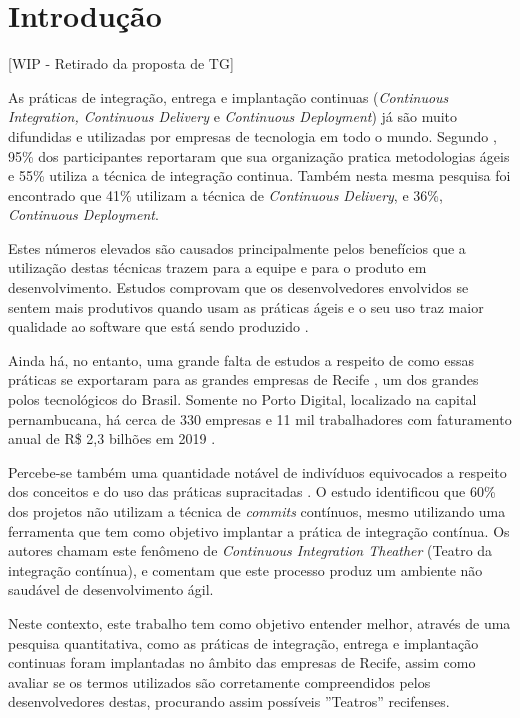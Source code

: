 
\chapter{Introdução}

[WIP - Retirado da proposta de TG]

As práticas de integração, entrega e implantação continuas (\emph{Continuous Integration, Continuous Delivery} e \emph{Continuous Deployment}) já são muito difundidas e utilizadas por empresas de tecnologia em todo o mundo. Segundo \cite{stateAgileReport2020}, 95\% dos participantes reportaram que sua organização pratica metodologias ágeis e 55\% utiliza a técnica de integração continua. Também nesta mesma pesquisa foi encontrado que 41\% utilizam a técnica de \emph{Continuous Delivery}, e 36\%, \emph{Continuous Deployment}.

Estes números elevados são causados principalmente pelos benefícios que a utilização destas técnicas trazem para a equipe e para o produto em desenvolvimento. Estudos comprovam que os desenvolvedores envolvidos se sentem mais produtivos quando usam as práticas ágeis \cite{hilton2016} e o seu uso traz maior qualidade ao software que está sendo produzido \cite{savor2015}. 

Ainda há, no entanto, uma grande falta de estudos a respeito de como essas práticas se exportaram para as grandes empresas de Recife \cite{empiricalStudy2016}, um dos grandes polos tecnológicos do Brasil. Somente no Porto Digital, localizado na capital pernambucana, há cerca de 330 empresas e 11 mil trabalhadores com faturamento anual de R\$ 2,3 bilhões em 2019 \cite{portoDigital}.

Percebe-se também uma quantidade notável de indivíduos equivocados a respeito dos conceitos e do uso das práticas supracitadas \cite{debbiche2014challenges}. O estudo \cite{citheater2019} identificou que 60\% dos projetos não utilizam a técnica de \emph{commits} contínuos, mesmo utilizando uma ferramenta que tem como objetivo implantar a prática de integração contínua. Os autores chamam este fenômeno de \emph{Continuous Integration Theather} (Teatro da integração contínua), e comentam que este processo produz um ambiente não saudável de desenvolvimento ágil.

Neste contexto, este trabalho tem como objetivo entender melhor, através de uma pesquisa quantitativa, como as práticas de integração, entrega e implantação continuas foram implantadas no âmbito das empresas de Recife, assim como avaliar se os termos utilizados são corretamente compreendidos pelos desenvolvedores destas, procurando assim possíveis ''Teatros'' recifenses. 

